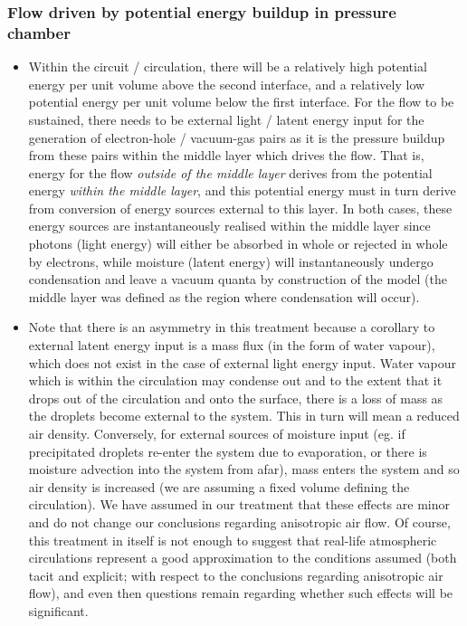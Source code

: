 \subsubsection{Flow driven by potential energy buildup in pressure chamber}

\begin{itemize}
	\item Within the circuit / circulation, there will be a relatively high potential energy per unit volume above the second interface, and a relatively low potential energy per unit volume below the first interface. For the flow to be sustained, there needs to be external light / latent energy input for the generation of electron-hole / vacuum-gas pairs as it is the pressure buildup from these pairs within the middle layer which drives the flow. That is, energy for the flow \textit{outside of the middle layer} derives from the potential energy \textit{within the middle layer}, and this potential energy must in turn derive from conversion of energy sources external to this layer. In both cases, these energy sources are instantaneously realised within the middle layer since photons (light energy) will either be absorbed in whole or rejected in whole by electrons, while moisture (latent energy) will instantaneously undergo condensation and leave a vacuum quanta by construction of the model (the middle layer was defined as the region where condensation will occur). 
	\item Note that there is an asymmetry in this treatment because a corollary to external latent energy input is a mass flux (in the form of water vapour), which does not exist in the case of external light energy input. Water vapour which is within the circulation may condense out and to the extent that it drops out of the circulation and onto the surface, there is a loss of mass as the droplets become external to the system. This in turn will mean a reduced air density. Conversely, for external sources of moisture input (eg. if precipitated droplets re-enter the system due to evaporation, or there is moisture advection into the system from afar), mass enters the system and so air density is increased (we are assuming a fixed volume defining the circulation). We have assumed in our treatment that these effects are minor and do not change our conclusions regarding anisotropic air flow. Of course, this treatment in itself is not enough to suggest that real-life atmospheric circulations represent a good approximation to the conditions assumed (both tacit and explicit; with respect to the conclusions regarding anisotropic air flow), and even then questions remain regarding whether such effects will be significant.
\end{itemize}

